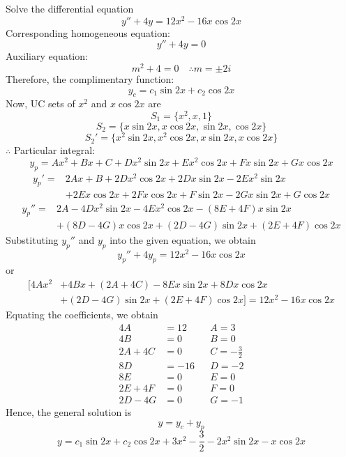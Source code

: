 \begin{example}{Solve the differential equation \[
    y'' + 4y = 12x^2 - 16x\cos{2x}
\]}{}\vspace{-20pt}
    Corresponding homogeneous equation: \[
        y'' + 4y = 0
    \] Auxiliary equation: \[
        m^2 + 4 = 0 \quad \therefore m = \pm 2i
    \] Therefore, the complimentary function: \[
        y_c = c_1\sin{2x} + c_2\cos{2x}
    \]
    Now, UC sets of $x^2$ and $x\cos{2x}$ are
    \[ S_1 = \{ x^2, x, 1 \} \]
    \[ S_2 = \{ x\sin{2x}, x\cos{2x}, \sin{2x}, \cos{2x} \} \]
    \[ S_2' = \{ x^2\sin{2x}, x^2\cos{2x}, x\sin{2x}, x\cos{2x} \} \]
    $\therefore$ Particular integral: \[
        y_p = Ax^2 + Bx + C + Dx^2\sin{2x} + Ex^2\cos{2x} + Fx\sin{2x} + Gx\cos{2x}
    \]
    \begin{equation*}
        \begin{split}
            y_p' =& 2Ax + B + 2Dx^2\cos{2x} + 2Dx\sin{2x} - 2Ex^2\sin{2x}\\
            &+ 2Ex\cos{2x} + 2Fx\cos{2x} + F\sin{2x} - 2Gx\sin{2x} + G\cos{2x}
        \end{split}
    \end{equation*}
    \begin{equation*}
        \begin{split}
            y_p'' =& 2A - 4Dx^2\sin{2x} - 4Ex^2\cos{2x} - (8E+4F)x\sin{2x}\\
            &+ (8D-4G)x\cos{2x} + (2D-4G)\sin{2x} + (2E+4F)\cos{2x}
        \end{split}
    \end{equation*}
    Substituting $y_p''$ and $y_p$ into the given equation, we obtain \[
        y_p'' + 4y_p = 12x^2 - 16x\cos{2x}
    \] or
    \begin{equation*}
        \begin{split}
            [ 4Ax^2 &+ 4Bx + (2A+4C) - 8Ex\sin{2x} + 8Dx\cos{2x}\\
            &+ (2D-4G)\sin{2x} + (2E+4F)\cos{2x} ] = 12x^2 - 16x\cos{2x}
        \end{split}
    \end{equation*}
    Equating the coefficients, we obtain
    \begin{align*}
        4A &= 12 && A = 3 \\
        4B &= 0 && B = 0 \\
        2A+4C &= 0 && C = -\frac{3}{2} \\
        8D &= -16 && D = -2 \\
        8E &= 0 && E = 0 \\
        2E + 4F &= 0 && F = 0 \\
        2D - 4G &= 0 && G = -1
    \end{align*}
    Hence, the general solution is \[
        y = y_c + y_p
    \] \[
        \boxed{ y = c_1\sin{2x} + c_2\cos{2x} + 3x^2 - \frac{3}{2} - 2x^2\sin{2x} - x\cos{2x} }
    \]
\end{example}
